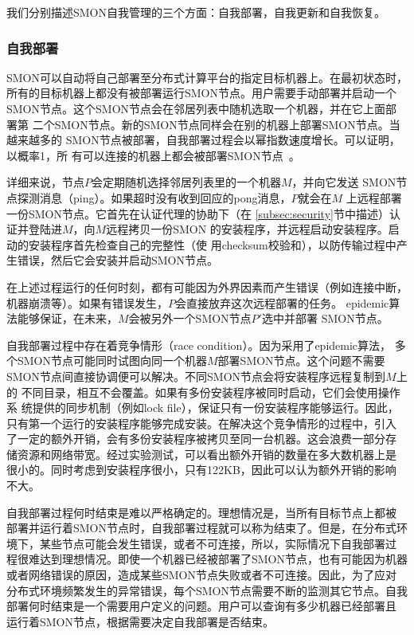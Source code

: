 我们分别描述SMON自我管理的三个方面：自我部署，自我更新和自我恢复。

\subsubsection*{自我部署}


SMON可以自动将自己部署至分布式计算平台的指定目标机器上。在最初状态时，
所有的目标机器上都没有被部署运行SMON节点。用户需要手动部署并启动一个
SMON节点。这个SMON节点会在邻居列表中随机选取一个机器，并在它上面部署第
二个SMON节点。新的SMON节点同样会在别的机器上部署SMON节点。当越来越多的
SMON节点被部署，自我部署过程会以幂指数速度增长。可以证明，以概率1，所
有可以连接的机器上都会被部署SMON节点~\cite{Eugster2004}。

详细来说，节点$P$会定期随机选择邻居列表里的一个机器$M$，并向它发送
SMON节点探测消息（ping）。如果超时没有收到回应的pong消息，$P$就会在$M$
上远程部署一份SMON节点。它首先在认证代理的协助下（在
\ref{subsec:security}节中描述）认证并登陆进$M$，向$M$远程拷贝一份SMON
的安装程序，并远程启动安装程序。启动的安装程序首先检查自己的完整性（使
用checksum校验和），以防传输过程中产生错误，然后它会安装并启动SMON节点。

在上述过程运行的任何时刻，都有可能因为外界因素而产生错误（例如连接中断，
机器崩溃等）。如果有错误发生，$P$会直接放弃这次远程部署的任务。
epidemic算法能够保证，在未来，$M$会被另外一个SMON节点$P'$选中并部署
SMON节点。

自我部署过程中存在着竞争情形（race condition）。因为采用了epidemic算法，
多个SMON节点可能同时试图向同一个机器$M$部署SMON节点。这个问题不需要
SMON节点间直接协调便可以解决。不同SMON节点会将安装程序远程复制到$M$上的
不同目录，相互不会覆盖。如果有多份安装程序被同时启动，它们会使用操作系
统提供的同步机制（例如lock file），保证只有一份安装程序能够运行。因此，
只有第一个运行的安装程序能够完成安装。在解决这个竞争情形的过程中，引入
了一定的额外开销，会有多份安装程序被拷贝至同一台机器。这会浪费一部分存
储资源和网络带宽。经过实验测试，可以看出额外开销的数量在多大数机器上是
很小的。同时考虑到安装程序很小，只有122KB，因此可以认为额外开销的影响
不大。

自我部署过程何时结束是难以严格确定的。理想情况是，当所有目标节点上都被
部署并运行着SMON节点时，自我部署过程就可以称为结束了。但是，在分布式环
境下，某些节点可能会发生错误，或者不可连接，所以，实际情况下自我部署过
程很难达到理想情况。即使一个机器已经被部署了SMON节点，也有可能因为机器
或者网络错误的原因，造成某些SMON节点失败或者不可连接。因此，为了应对
分布式环境频繁发生的异常错误，每个SMON节点需要不断的监测其它节点。自我
部署何时结束是一个需要用户定义的问题。用户可以查询有多少机器已经部署且
运行着SMON节点，根据需要决定自我部署是否结束。

